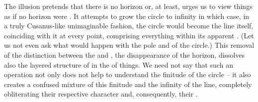 The illusion pretends that there is no horizon or, at least, urges us to view
things as if no horizon were . It attempts to grow the circle to
infinity in which case, in a truly Cusanus-like unimaginable fashion, the circle
would become the line itself, coinciding with it at every point, comprising
everything within its apparent . (Let us not even ask what would
happen with the pole and  of the circle.) This removal of the
distinction between the  and , the disappearance of
the horizon, dissolves also the layered structure of  in the
 of things. We need not say that such an operation not only
does not help to understand the finitude of the circle -- it also creates a
confused mixture of this finitude and the infinity of the line, completely
obliterating their respective character and, consequently, their
.







